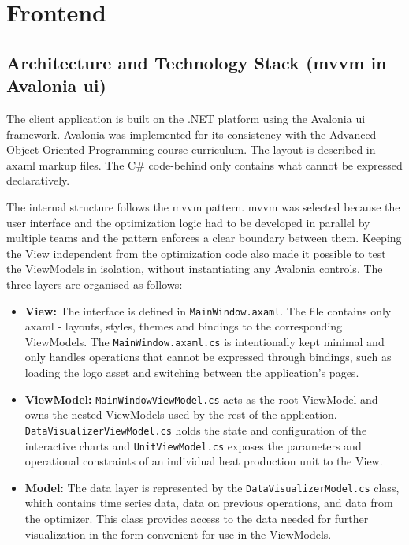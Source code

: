 
\raggedbottom
\section{Frontend}

\subsection{Architecture and Technology Stack (\acrshort{mvvm} in Avalonia \acrshort{ui})}
\label{sec:architecture-mvvm-avalonia}

The client application is built on the .NET platform using the Avalonia \acrshort{ui} framework. Avalonia was implemented for its consistency with the Advanced Object-Oriented Programming course curriculum. The layout is described in \acrshort{axaml} markup files. The C\# code-behind only contains what cannot be expressed declaratively.

The internal structure follows the \acrfull{mvvm} pattern. \acrshort{mvvm} was selected because the user interface and the optimization logic had to be developed in parallel by multiple teams and the pattern enforces a clear boundary between them. Keeping the View independent from the optimization code also made it possible to test the ViewModels in isolation, without instantiating any Avalonia controls. The three layers are organised as follows:

\begin{itemize}
    \item \textbf{View:} The interface is defined in \texttt{MainWindow.axaml}. The file contains only \acrshort{axaml} - layouts, styles, themes and bindings to the corresponding ViewModels. The \texttt{MainWindow.axaml.cs} is intentionally kept minimal and only handles operations that cannot be expressed through bindings, such as loading the logo asset and switching between the application's pages.
    \item \textbf{ViewModel:} \texttt{MainWindowViewModel.cs} acts as the root ViewModel and owns the nested ViewModels used by the rest of the application. \texttt{DataVisualizer\-ViewModel.cs} holds the state and configuration of the interactive charts and \texttt{UnitViewModel.cs} exposes the parameters and operational constraints of an individual heat production unit to the View.
    \item \textbf{Model:} The data layer is represented by the \texttt{DataVisualizerModel.cs} class, which contains time series data, data on previous operations, and data from the optimizer. This class provides access to the data needed for further visualization in the form convenient for use in the ViewModels.
\end{itemize}

